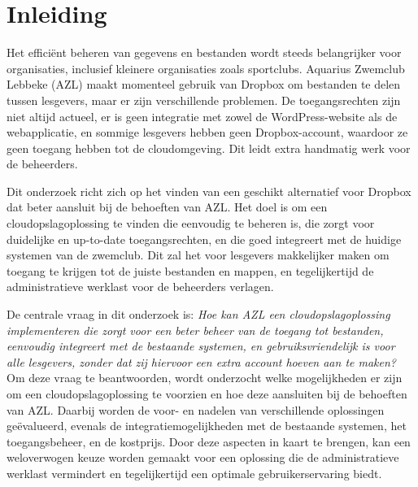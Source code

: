 


% 

\section{Inleiding}%
\label{sec:inleiding}

Het efficiënt beheren van gegevens en bestanden wordt steeds belangrijker voor organisaties, 
inclusief kleinere organisaties zoals sportclubs. Aquarius Zwemclub Lebbeke (AZL) maakt momenteel 
gebruik van Dropbox om bestanden te delen tussen lesgevers, maar er zijn verschillende problemen. 
De toegangsrechten zijn niet altijd actueel, er is geen integratie met zowel de WordPress-website als de webapplicatie, en sommige 
lesgevers hebben geen Dropbox-account, waardoor ze geen toegang hebben tot de cloudomgeving. 
Dit leidt extra handmatig werk voor de beheerders.

Dit onderzoek richt zich op het vinden van een geschikt alternatief voor Dropbox dat beter aansluit 
bij de behoeften van AZL. Het doel is om een cloudopslagoplossing te vinden die eenvoudig te beheren is, 
die zorgt voor duidelijke en up-to-date toegangsrechten, en die goed integreert met de huidige systemen van de zwemclub. 
Dit zal het voor lesgevers makkelijker maken om toegang te krijgen tot de juiste bestanden en mappen, en tegelijkertijd de 
administratieve werklast voor de beheerders verlagen.

De centrale vraag in dit onderzoek is: \textit{Hoe kan AZL een cloudopslagoplossing implementeren die zorgt voor een beter beheer van de 
toegang tot bestanden, eenvoudig integreert met de bestaande systemen, en gebruiksvriendelijk is voor alle lesgevers, zonder dat zij hiervoor 
een extra account hoeven aan te maken?} Om deze vraag te beantwoorden, wordt onderzocht welke mogelijkheden er zijn om een cloudopslagoplossing 
te voorzien en hoe deze aansluiten bij de behoeften van AZL. Daarbij worden de voor- en nadelen van verschillende oplossingen geëvalueerd, 
evenals de integratiemogelijkheden met de bestaande systemen, het toegangsbeheer, en de kostprijs. Door deze aspecten in kaart te brengen, 
kan een weloverwogen keuze worden gemaakt voor een oplossing die de administratieve werklast vermindert en tegelijkertijd een optimale gebruikerservaring biedt.


